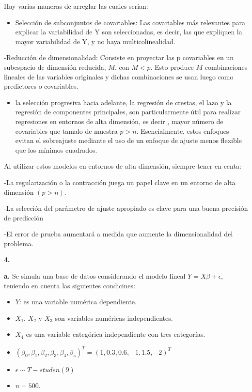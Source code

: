 \documentclass[
]{article}
\providecommand{\tightlist}{%
  \setlength{\itemsep}{0pt}\setlength{\parskip}{0pt}}
\begin{document}
Hay varias maneras de arreglar las cuales serian:

\begin{itemize}
\tightlist
\item
  Selección de subconjuntos de covariables: Las covariables más
  relevantes para explicar la variabilidad de Y son seleccionadas, es
  decir, las que expliquen la mayor variabilidad de Y, y no haya
  multicolinealidad.
\end{itemize}

-Reducción de dimensionalidad: Consiste en proyectar las p covariables
en un subespacio de dimensión reducida, \(M\), con \(M < p\). Esto
produce \(M\) combinaciones lineales de las variables originales y
dichas combinaciones se usan luego como predictores o covariables.

\begin{itemize}
\tightlist
\item
  la selección progresiva hacia adelante, la regresión de crestas, el
  lazo y la regresión de componentes principales, son particularmente
  útil para realizar regresiones en entornos de alta dimensión, es decir
  , mayor número de covariables que tamalo de muestra \(p > n\).
  Esencialmente, estos enfoques evitan el sobreajuste mediante el uso de
  un enfoque de ajuste menos flexible que los mínimos cuadrados.
\end{itemize}

Al utilizar estos modelos en entornos de alta dimensión, siempre tener
en centa:

-La regularización o la contracción juega un papel clave en un entorno
de alta dimensión \((p> n)\).

-La selección del parámetro de ajuste apropiado es clave para una buena
precisión de predicción

-El error de prueba aumentará a medida que aumente la dimensionalidad
del problema.

\textbf{4.}

\textbf{a.} Se simula una base de datos considerando el modelo lineal
\(Y=X\beta+\epsilon\), teniendo en cuenta las siguientes condicines:

\begin{itemize}
\tightlist
\item
  \(Y\): es una variable numérica dependiente.
\item
  \(X_1\), \(X_2\) y \(X_3\) son variables numéricas independientes.
\item
  \(X_4\) es una variable categórica independiente con tres categorías.
\item
  \((\beta_0,\beta_1,\beta_2,\beta_3,\beta_4,\beta_5)^T=(1,0.3,0.6,-1,1.5,-2)^T\)
\item
  \(\epsilon \sim T-studen(9)\)
\item
  \(n=500\).
\end{itemize}
\end{document}
